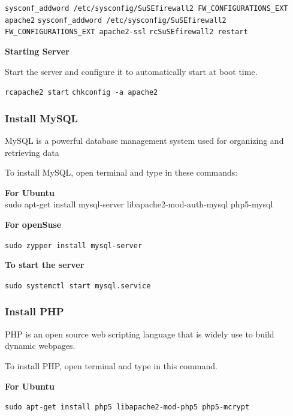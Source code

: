 \documentclass[16pt]{article}
\begin{document}
  \vspace{0.5cm}

  \texttt{sysconf\_addword /etc/sysconfig/SuSEfirewall2 FW\_CONFIGURATIONS\_EXT apache2}
  \texttt{sysconf\_addword /etc/sysconfig/SuSEfirewall2 FW\_CONFIGURATIONS\_EXT apache2-ssl}
  \texttt{rcSuSEfirewall2 restart}
  
   \vspace{0.5cm}

  \textbf{Starting Server}

  Start the server and configure it to automatically start at boot time.

  \texttt{rcapache2 start} \texttt{chkconfig -a apache2}
  
   \vspace{0.5cm}

  \subsubsection{Install MySQL}
  
   \vspace{0.5cm}

  MySQL is a powerful database management system used for organizing and
  retrieving data

  To install MySQL, open terminal and type in these commands:

  \textbf{For Ubuntu} \\ sudo apt-get install mysql-server
  libapache2-mod-auth-mysql php5-mysql

  \textbf{For openSuse}

  \texttt{sudo zypper install mysql-server}

  \textbf{To start the server}

  \texttt{sudo systemctl start mysql.service}
  
   \vspace{1cm}

  \subsubsection{Install PHP}
   \vspace{0.5cm}

  PHP is an open source web scripting language that is widely use to build
  dynamic webpages.

  To install PHP, open terminal and type in this command.

  \textbf{For Ubuntu}

  \texttt{sudo apt-get install php5 libapache2-mod-php5 php5-mcrypt}
\end{document}
